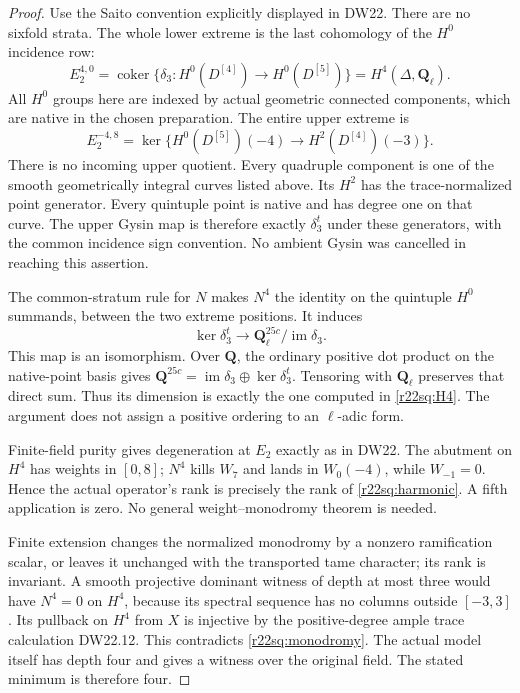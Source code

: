 \begin{proof}
Use the Saito convention explicitly displayed in DW22.
There are no sixfold strata.  The whole lower extreme is
the last cohomology of the $H^0$ incidence row:
\[
 E_2^{4,0}=\operatorname{coker}
   \{\delta_3:H^0(D^{[4]})\longrightarrow H^0(D^{[5]})\}
                    =H^4(\Delta,\mathbf Q_\ell).
 \tag{SQ22.8}\label{r22sq:lower}
\]
All $H^0$ groups here are indexed by actual geometric
connected components, which are native in the chosen
preparation.  The entire upper extreme is
\[
 E_2^{-4,8}=\ker\{H^0(D^{[5]})(-4)
                         \longrightarrow H^2(D^{[4]})(-3)\}.
 \tag{SQ22.9}\label{r22sq:upper}
\]
There is no incoming upper quotient.  Every quadruple
component is one of the smooth geometrically integral
curves listed above.  Its $H^2$ has the trace-normalized
point generator.  Every quintuple point is native and
has degree one on that curve.  The upper Gysin map is
therefore exactly $\delta_3^t$ under these generators,
with the common incidence sign convention.  No ambient
Gysin was cancelled in reaching this assertion.

The common-stratum rule for $N$ makes $N^4$ the identity
on the quintuple $H^0$ summands, between the two extreme
positions.  It induces
\[
 \ker\delta_3^t\longrightarrow
                    \mathbf Q_\ell^{25c}/\operatorname{im}\delta_3.
 \tag{SQ22.10}\label{r22sq:harmonic}
\]
This map is an isomorphism.  Over $\mathbf Q$, the
ordinary positive dot product on the native-point basis
gives
$\mathbf Q^{25c}=\operatorname{im}\delta_3\oplus
\ker\delta_3^t$.  Tensoring with $\mathbf Q_\ell$ preserves
that direct sum.  Thus its dimension is exactly the one
computed in \eqref{r22sq:H4}.  The argument does not assign
a positive ordering to an $\ell$-adic form.

Finite-field purity gives degeneration at $E_2$ exactly
as in DW22.  The abutment on $H^4$ has weights in $[0,8]$;
$N^4$ kills $W_7$ and lands in $W_0(-4)$, while $W_{-1}=0$.
Hence the actual operator's rank is precisely the rank
of \eqref{r22sq:harmonic}.  A fifth application is zero.
No general weight--monodromy theorem is needed.

Finite extension changes the normalized monodromy by a
nonzero ramification scalar, or leaves it unchanged with
the transported tame character; its rank is invariant.
A smooth projective dominant witness of depth at most
three would have $N^4=0$ on $H^4$, because its spectral
sequence has no columns outside $[-3,3]$.  Its pullback
on $H^4$ from $X$ is injective by the positive-degree
ample trace calculation DW22.12.  This contradicts
\eqref{r22sq:monodromy}.  The actual model itself has
depth four and gives a witness over the original field.
The stated minimum is therefore four.
\end{proof}

